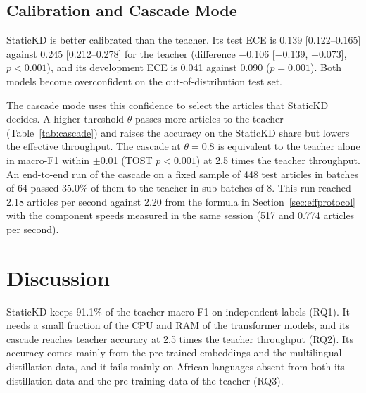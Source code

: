 \documentclass{ieeeaccess}
\begin{document}
\subsection{Calibration and Cascade Mode}
\label{sec:res-calib}
\begin{table}[!t]
\caption{Cascade of StaticKD and the ONNX Int8 Teacher on the Test Set}
\label{tab:cascade}
\centering
\footnotesize
\setlength{\tabcolsep}{2.5pt}
\end{table}
StaticKD is better calibrated than the teacher. Its test ECE is 0.139 [0.122--0.165] against 0.245 [0.212--0.278] for the teacher (difference $-$0.106 [$-$0.139, $-$0.073], $p<0.001$), and its development ECE is 0.041 against 0.090 ($p=0.001$). Both models become overconfident on the out-of-distribution test set.

The cascade mode uses this confidence to select the articles that StaticKD decides. A higher threshold $\theta$ passes more articles to the teacher (Table~\ref{tab:cascade}) and raises the accuracy on the StaticKD share but lowers the effective throughput. The cascade at $\theta=0.8$ is equivalent to the teacher alone in macro-F1 within $\pm$0.01 (TOST $p<0.001$) at 2.5 times the teacher throughput. An end-to-end run of the cascade on a fixed sample of 448 test articles in batches of 64 passed 35.0\% of them to the teacher in sub-batches of 8. This run reached 2.18 articles per second against 2.20 from the formula in Section~\ref{sec:effprotocol} with the component speeds measured in the same session (517 and 0.774 articles per second).

\section{Discussion}
\label{sec:discussion}
StaticKD keeps 91.1\% of the teacher macro-F1 on independent labels (RQ1). It needs a small fraction of the CPU and RAM of the transformer models, and its cascade reaches teacher accuracy at 2.5 times the teacher throughput (RQ2). Its accuracy comes mainly from the pre-trained embeddings and the multilingual distillation data, and it fails mainly on African languages absent from both its distillation data and the pre-training data of the teacher (RQ3).
\end{document}
